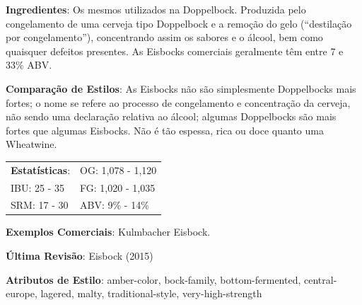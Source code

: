 \textbf{Ingredientes}: Os mesmos utilizados na Doppelbock. Produzida pelo congelamento de uma cerveja tipo Doppelbock e a remoção do gelo (“destilação por congelamento”), concentrando assim os sabores e o álcool, bem como quaisquer defeitos presentes. As Eisbocks comerciais geralmente têm entre 7 e 33\% ABV.

\textbf{Comparação de Estilos}: As Eisbocks não são simplesmente Doppelbocks mais fortes; o nome se refere ao processo de congelamento e concentração da cerveja, não sendo uma declaração relativa ao álcool; algumas Doppelbocks são mais fortes que algumas Eisbocks. Não é tão espessa, rica ou doce quanto uma Wheatwine.

\begin{tabular}{@{}p{35mm}p{35mm}@{}}
  \textbf{Estatísticas}: & OG: 1,078 - 1,120 \\
  IBU: 25 - 35 & FG: 1,020 - 1,035 \\
  SRM: 17 - 30 & ABV: 9\% - 14\%
\end{tabular}

\textbf{Exemplos Comerciais}: Kulmbacher Eisbock.

\textbf{Última Revisão}: Eisbock (2015)

\textbf{Atributos de Estilo}: amber-color, bock-family, bottom-fermented, central-europe, lagered, malty, traditional-style, very-high-strength
